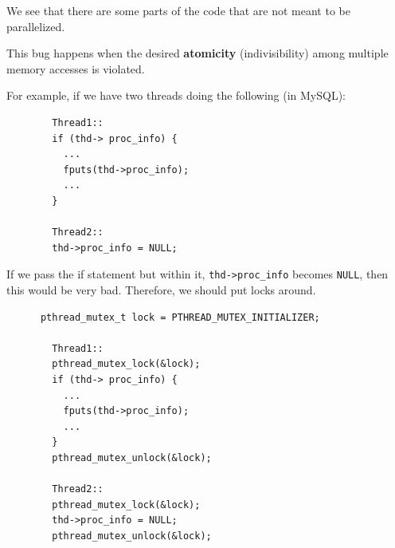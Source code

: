 \documentclass{article}
\newcounter{definition}[section]
\newcounter{example}[section]
\newcounter{code}[section]
\begin{document}
    We see that there are some parts of the code that are not meant to be parallelized. 

    \begin{definition}
      \label{def:atomicity-violation-bugs}
 
      This bug happens when the desired \textbf{atomicity} (indivisibility) among multiple memory accesses is violated. 
    \end{definition}

    \begin{example}
      \label{ex:atomicity-violation-in-sql}
      For example, if we have two threads doing the following (in MySQL): 
      \begin{lstlisting}
        Thread1:: 
        if (thd-> proc_info) {
          ...
          fputs(thd->proc_info); 
          ...
        }

        Thread2::
        thd->proc_info = NULL; 
      \end{lstlisting}
      If we pass the if statement but within it, \texttt{thd->proc\_info} becomes \texttt{NULL}, then this would be very bad. Therefore, we should put locks around. 
      \begin{lstlisting}
      pthread_mutex_t lock = PTHREAD_MUTEX_INITIALIZER; 

        Thread1:: 
        pthread_mutex_lock(&lock); 
        if (thd-> proc_info) {
          ...
          fputs(thd->proc_info); 
          ...
        }
        pthread_mutex_unlock(&lock); 

        Thread2::
        pthread_mutex_lock(&lock); 
        thd->proc_info = NULL; 
        pthread_mutex_unlock(&lock); 
      \end{lstlisting}
    \end{example}
\end{document}
